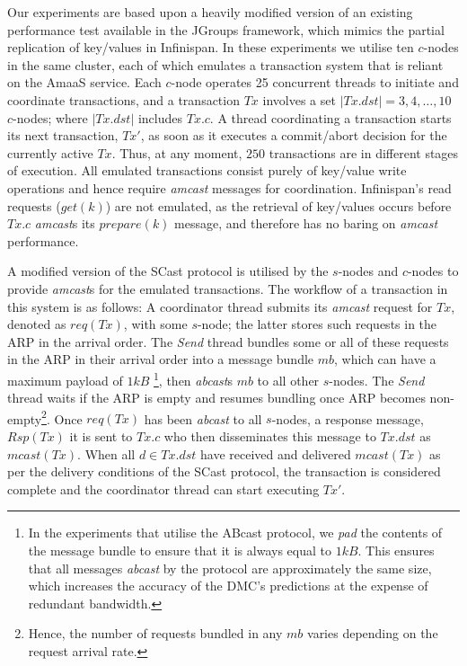 	Our experiments are based upon a heavily modified version of an existing performance test available in the JGroups\citep{JGroups} framework, which mimics the partial replication of key/values in Infinispan\citep{Infinispan}.  In these experiments we utilise ten $c$-nodes in the same cluster, each of which emulates a transaction system that is reliant on the \textsf{AmaaS} service.  Each $c$-node operates 25 concurrent threads to initiate and coordinate transactions, and a transaction $Tx$ involves a set $|Tx.dst| = 3,4,\ldots,10$ $c$-nodes; where $|Tx.dst|$ includes $Tx.c$. A thread coordinating a transaction starts its next transaction, $Tx'$, as soon as it executes a commit/abort decision for the currently active $Tx$. Thus, at any moment, $250$ transactions are in different stages of execution.  All emulated transactions consist purely of key/value write operations and hence require \emph{amcast} messages for coordination.  Infinispan's read requests ($get(k)$) are not emulated, as the retrieval of key/values occurs before $Tx.c$ \emph{amcast}s its $prepare(k)$ message, and therefore has no baring on \emph{amcast} performance.  
	
	A modified version of the \textsf{SCast} protocol is utilised by the $s$-nodes and $c$-nodes to provide \emph{amcast}s for the emulated transactions.  The workflow of a transaction in this system is as follows: A coordinator thread submits its \emph{amcast} request for $Tx$, denoted as $req(Tx)$, with some $s$-node; the latter stores such requests in the ARP in the arrival order. The \emph{Send} thread bundles some or all of these requests in the ARP in their arrival order into a message bundle $mb$, which can have a maximum payload of $1kB$ \footnote{In the experiments that utilise the \textsf{ABcast} protocol, we \emph{pad} the contents of the message bundle to ensure that it is always equal to $1kB$.  This ensures that all messages \emph{abcast} by the protocol are approximately the same size, which increases the accuracy of the DMC's predictions at the expense of redundant bandwidth.}, then \emph{abcast}s $mb$ to all other $s$-nodes.  The \emph{Send} thread waits if the ARP is empty and resumes bundling once ARP becomes non-empty\footnote{Hence, the number of requests bundled in any $mb$ varies depending on the request arrival rate.}. Once $req(Tx)$ has been \emph{abcast} to all $s$-nodes, a response message, $Rsp(Tx)$ it is sent to $Tx.c$ who then disseminates this message to $Tx.dst$ as $mcast(Tx)$.  When all $d \in Tx.dst$ have received and delivered $mcast(Tx)$ as per the delivery conditions of the \textsf{SCast} protocol, the transaction is considered complete and the coordinator thread can start executing $Tx'$.  
	
